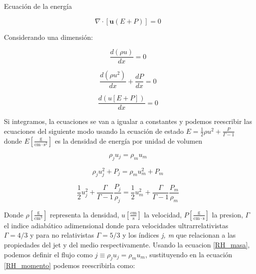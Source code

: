 \documentclass[12pt,a4paper]{book}
\begin{document}
Ecuación de la energía

\begin{equation}
 \nabla \cdot \left[ \mathbf{u} \left( E+P \right) \right] = 0
\end{equation}

Considerando una dimensión:

\begin{equation}
\dfrac{d \left( \rho u \right)}{d x} = 0
\end{equation}

\begin{equation}
\dfrac{d \left( \rho u^2 \right)}{d x}+ \dfrac{d P}{d x}=0
\end{equation}

\begin{equation}
\dfrac{d \left( u\left[E+P \right] \right)}{d x} = 0
\end{equation}

Si integramos, la ecuaciones se van a igualar a constantes y podemos reescribir las ecuaciones del siguiente modo usando la ecuación de estado $E = \frac{1}{2} \rho u^2 + \frac{P}{\Gamma-1}$ donde $E \left[\frac{\mathrm{g}}{\mathrm{cm} \cdot \mathrm{s}^2}\right]$ es la densidad de energía por unidad de volumen

\begin{equation}\label{RH_masa}
\rho_j u_j = \rho_m u_m
\end{equation}

\begin{equation}\label{RH_momento}
\rho_j u_{j}^{2}+P_j = \rho_m u_{m}^{2}+P_m
\end{equation}

\begin{equation}\label{RH_Energia}
\frac{1}{2} u_{j}^{2}+ \frac{\Gamma}{\Gamma-1} \frac{P_{j}}{\rho_{j}} =
 \frac{1}{2} u_{m}^{2}+ \frac{\Gamma}{\Gamma-1} \frac{P_{m}}{\rho_{m}}
\end{equation}

Donde $\rho \left[\frac{\mathrm{g}}{\mathrm{cm}^3}\right]$ representa la densidad, $u \left[\frac{\mathrm{cm}}{\mathrm{s} }\right]$ la velocidad, $P \left[\frac{\mathrm{g}}{\mathrm{cm} \cdot \mathrm{s}}\right]$ la presion, $\Gamma$ el indice adiabático adimensional donde para velocidades ultrarrelativistas $\Gamma = 4/3$ y para no relativistas $\Gamma = 5/3$ y los índices \textit{j, m} que  relacionan a las propiedades del jet y del medio respectivamente. Usando la ecuacion \ref{RH_masa}, podemos definir el flujo como $j \equiv \rho_j u_j = \rho_m u_m$, sustituyendo en la ecuación \ref{RH_momento} podemos reescribirla como:
\end{document}
